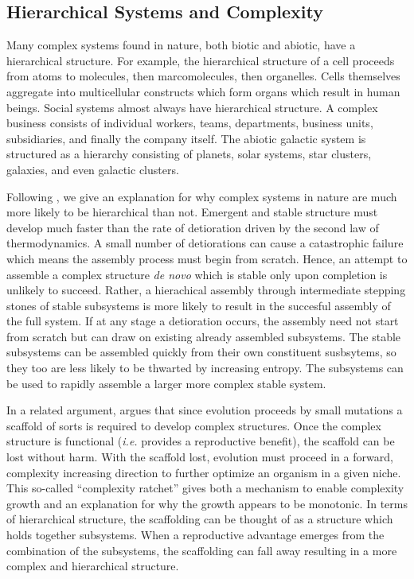 \subsection{Hierarchical Systems and Complexity}

Many complex systems found in nature, both biotic and abiotic, have a
hierarchical structure. For example, the hierarchical structure of a cell
proceeds from atoms to molecules, then marcomolecules, then
organelles. Cells themselves aggregate into multicellular constructs which form
organs which result in human beings. Social systems almost always have
hierarchical structure. A complex business consists of individual workers,
teams, departments, business units, subsidiaries, and finally the company itself.
The abiotic galactic system is structured as a hierarchy consisting of
planets, solar systems, star clusters, galaxies, and even galactic clusters.

Following \citet{simon1991architecture}, we give an explanation for why complex
systems in nature are much more likely to be hierarchical than not. Emergent
and stable structure must develop much faster than the rate of detioration
driven by the second law of thermodynamics. A small number of detiorations can
cause a catastrophic failure which means the assembly process must begin from
scratch.  Hence, an attempt to assemble a complex structure \emph{de novo}
which is stable only upon completion is unlikely to succeed. Rather, a
hierachical assembly through intermediate stepping stones of stable subsystems
is more likely to result in the succesful assembly of the full system. If at
any stage a detioration occurs, the assembly need not start from scratch but
can draw on existing already assembled subsystems. The stable subsystems can be
assembled quickly from their own constituent susbsytems, so they too are less
likely to be thwarted by increasing entropy. The subsystems can be used to
rapidly assemble a larger more complex stable system.

In a related argument, \citet{cairns1995complexity} argues that since evolution
proceeds by small mutations a scaffold of sorts is required to develop complex
structures. Once the complex structure is functional (\emph{i.e.} provides a
reproductive benefit), the scaffold can be lost without harm. With the
scaffold lost, evolution must proceed in a forward, complexity increasing
direction to further optimize an organism in a given niche. This so-called
``complexity ratchet'' gives both a mechanism to enable complexity growth and
an explanation for why the growth appears to be monotonic. In terms of
hierarchical structure, the scaffolding can be thought of as a structure which
holds together subsystems. When a reproductive advantage emerges from the
combination of the subsystems, the scaffolding can fall away resulting in a
more complex and hierarchical structure.

